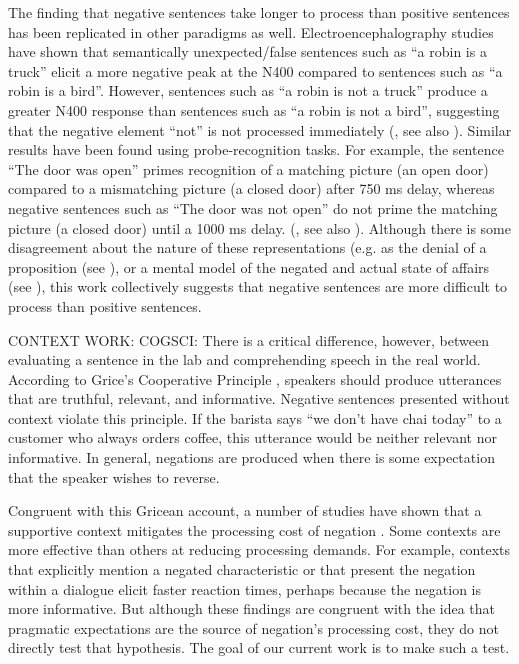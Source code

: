\documentclass[man]{apa2}
\begin{document}
The finding that negative sentences take longer to process than positive sentences has been replicated in other paradigms as well.  Electroencephalography studies have shown that semantically unexpected/false sentences such as ``a robin is a truck'' elicit a more negative peak at the N400 compared to sentences such as ``a robin is a bird''.  However, sentences such as ``a robin is not a truck'' produce a greater N400 response than sentences such as ``a robin is not a bird'', suggesting that the negative element ``not'' is not processed immediately (, see also ).  Similar results have been found using probe-recognition tasks.  For example, the sentence ``The door was open'' primes recognition of  a matching picture (an open door) compared to a mismatching picture (a closed door) after 750 ms delay, whereas negative sentences such as ``The door was not open'' do not prime the matching picture (a closed door) until a 1000 ms delay.  (, see also ).  Although there is some disagreement about the nature of these representations (e.g. as the denial of a proposition (see ), or a mental model of the negated and actual state of affairs (see ), this work collectively suggests that negative sentences are more difficult to process than positive sentences.  










CONTEXT WORK:
 COGSCI:
There is a critical difference, however, between evaluating a sentence in the lab and comprehending speech in the real world. According to Grice's Cooperative Principle \cite{grice1975}, speakers should produce utterances that are truthful, relevant, and informative.  Negative sentences presented without context violate this principle.  If the barista says ``we don't have chai today'' to a customer who always orders coffee, this utterance would be neither relevant nor informative.  In general, negations are produced when there is some expectation that the speaker wishes to reverse.  

Congruent with this Gricean account, a number of studies have shown that a supportive context mitigates the processing cost of negation \cite{wason1965, glenberg1999, ludtke2006, nieuwland2008, dale2011}. Some contexts are more effective than others at reducing processing demands. For example, contexts that explicitly mention a negated characteristic \cite{ludtke2006} or that present the negation within a dialogue \cite{dale2011} elicit faster reaction times, perhaps because the negation is more informative. But although these findings are congruent with the idea that pragmatic expectations are the source of negation's processing cost, they do not directly test that hypothesis.  The goal of our current work is to make such a test.
\end{document}
